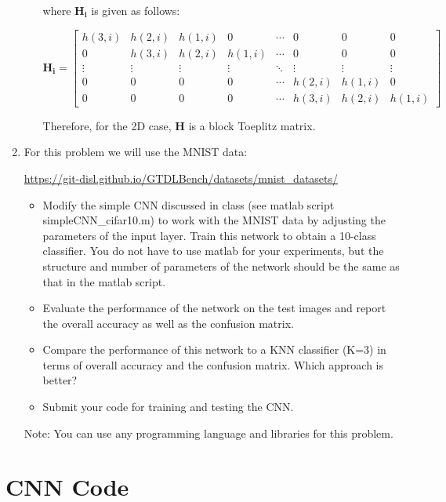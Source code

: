 \documentclass[fleqn]{article}
\begin{document}
\begin{enumerate}
\begin{enumerate}
			where $\mathbf{H_i}$ is given as follows:
			
			\begin{equation*}
				\mathbf{H_i} = \begin{bmatrix}
					h(3,i) & h(2,i) & h(1,i) & 0      & \cdots & 0      & 0      & 0 \\
					0      & h(3,i) & h(2,i) & h(1,i) & \cdots & 0      & 0      & 0 \\
					\vdots & \vdots & \vdots & \vdots & \ddots & \vdots & \vdots & \vdots \\
					0      & 0      & 0      & 0      & \cdots & h(2,i) & h(1,i) & 0 \\
					0      & 0      & 0      & 0      & \cdots & h(3,i) & h(2,i) & h(1,i)
				\end{bmatrix}
			\end{equation*}
			
			Therefore, for the 2D case, $\mathbf{H}$ is a block Toeplitz matrix.
		\end{enumerate}
		
		\item For this problem we will use the MNIST data:
		
		\href{https://git-disl.github.io/GTDLBench/datasets/mnist\_datasets/}{https://git-disl.github.io/GTDLBench/datasets/mnist\_datasets/}
		
		\begin{itemize}
			\item Modify the simple CNN discussed in class (see matlab script \newline simpleCNN\_cifar10.m) to work with the MNIST data by adjusting the parameters of the input layer. Train this network to obtain a 10-class classifier. You do not have to use matlab for your experiments, but the structure and number of parameters of the network should be the same as that in the matlab script.
			
			\item Evaluate the performance of the network on the test images and report the overall accuracy as well as the confusion matrix.
			
			\item Compare the performance of this network to a KNN classifier (K=3) in terms of overall accuracy and the confusion matrix. Which approach is better?
			
			\item Submit your code for training and testing the CNN.
			
		\end{itemize}
		
		Note: You can use any programming language and libraries for this \newline problem.
	\end{enumerate}
	
	\pagebreak
	\appendix
	\section{CNN Code}
	\label{cnn_code}
	\lstset{style=Matlab-editor,basicstyle=\ttfamily\footnotesize}
	
	
	
	\raggedbottom
\end{document}
